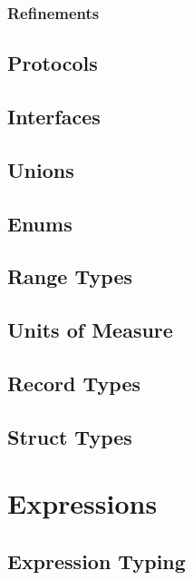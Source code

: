\subsection{Refinements}
\label{sec:refinements}

\section{Protocols}
\label{sec:protocols}

\section{Interfaces}
\label{sec:interfaces}

\section{Unions}
\label{sec:unions}

\section{Enums}
\label{sec:enums}

\section{Range Types}
\label{sec:range-types}

\section{Units of Measure}
\label{sec:units-of-measure}

\section{Record Types}
\label{sec:record-types}

\section{Struct Types}
\label{sec:struct-types}


\chapter{Expressions}

\section{Expression Typing}

